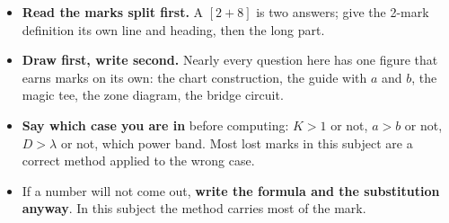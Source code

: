 \begin{itemize}
  \item \textbf{Read the marks split first.} A $[2+8]$ is two answers; give the 2-mark
    definition its own line and heading, then the long part.
  \item \textbf{Draw first, write second.} Nearly every question here has one figure that
    earns marks on its own: the chart construction, the guide with $a$ and $b$, the magic
    tee, the zone diagram, the bridge circuit.
  \item \textbf{Say which case you are in} before computing: $K>1$ or not, $a>b$ or not,
    $D>\lambda$ or not, which power band. Most lost marks in this subject are a correct
    method applied to the wrong case.
  \item If a number will not come out, \textbf{write the formula and the substitution
    anyway}. In this subject the method carries most of the mark.
\end{itemize}
